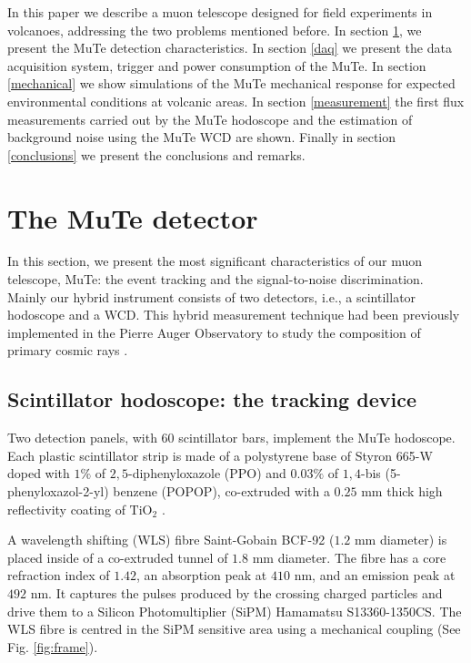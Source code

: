 \documentclass[letterpaper,11pt]{article}
\begin{document}
In this paper we describe a muon telescope designed for field experiments in volcanoes, addressing the two problems mentioned before. In section \ref{detector}, we present the MuTe detection characteristics. In section \ref{daq} we present the data acquisition system, trigger and power consumption of the MuTe. In section \ref{mechanical} we show simulations of the MuTe mechanical response for expected environmental conditions at volcanic areas. In section \ref{measurement} the first flux measurements carried out by the MuTe hodoscope and the estimation of background noise using the MuTe WCD are shown. Finally in section \ref{conclusions} we present the conclusions and remarks.

\section{The MuTe detector}
\label{detector}
In this section, we present the most significant characteristics of our muon telescope, MuTe: the event tracking and the signal-to-noise discrimination. Mainly our hybrid instrument consists of two detectors, i.e., a scintillator hodoscope and a WCD. This hybrid measurement technique had been previously implemented in the Pierre Auger Observatory to study the composition of primary cosmic rays \cite{martello2017pierre, aab2017muon, aab2016prototype}.

\subsection{Scintillator hodoscope: the tracking device}
Two detection panels, with 60 scintillator bars, implement the MuTe hodoscope. Each plastic scintillator strip is made of a polystyrene base of Styron 665-W doped with $1\%$ of $2,5$-diphenyloxazole (PPO) and $0.03\%$ of $1,4$-bis (5-phenyloxazol-2-yl) benzene (POPOP), co-extruded with a $0.25$ mm thick high reflectivity coating of $\text{TiO}_{\text{2}}$ \cite{PlaDalmau2003}. 

A wavelength shifting (WLS) fibre Saint-Gobain BCF-92 ($1.2$ mm diameter) is placed inside of a co-extruded tunnel of $1.8$ mm diameter. The fibre has a core refraction index of $1.42$, an absorption peak at $410$ nm, and an emission peak at $492$ nm. It captures the pulses produced by the crossing charged particles and drive them to a Silicon Photomultiplier (SiPM) Hamamatsu S13360-1350CS. The WLS fibre is centred in the SiPM sensitive area using a mechanical coupling (See Fig. \ref{fig:frame}). 
\end{document}
